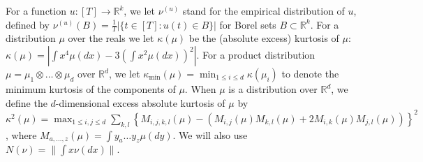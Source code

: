 \documentclass{article} %
\newcommand{\real}{\mathbb{R}}
\theoremstyle{definition}
\begin{document}
For a function $u:[T] \to \real^k$, we let $\nu^{(u)}$ stand for the empirical distribution of $u$,
defined by
$\nu^{(u)}(B)=\tfrac{1}{T}|\{t \in [T]: u(t) \in B\}|$ for Borel sets $B \subset \real^k$.
For a distribution $\mu$ over the reals we let $\kappa(\mu)$ be the (absolute excess) kurtosis of $\mu$: 
$\kappa(\mu) = |\int x^4 \mu(dx) - 3 (\int x^2 \mu(dx))^2|$.
For a product distribution $\mu= \mu_1\otimes \ldots \otimes \mu_d$ over $\real^d$, we let $\kappa_{\min}(\mu)
=\min_{1\le i \le d} \kappa(\mu_i)$ to denote the minimum kurtosis of the components of $\mu$.
When $\mu$ is a distribution over $\real^d$, we define the $d$-dimensional excess absolute kurtosis of $\mu$ by
$\kappa^2(\mu) = \max_{1\le i,j\le d} \sum_{k,l} 
\left\{ 
M_{i,j,k,l}(\mu)  - (M_{i,j}(\mu) M_{k,l}(\mu)+ 2 M_{i,k}(\mu) M_{j,l}(\mu))
\right\}^2$, where $M_{a,\dots,z}(\mu) = \int y_a \dots y_z \mu(dy)$.
We will also use $N(\nu) = \|\int x \nu(dx)\|$.
\end{document}
